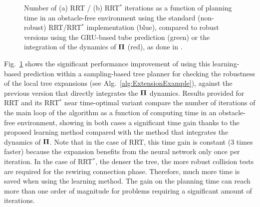 \begin{figure} [!t]
    \centering
    \caption{Number of (a) RRT / (b) RRT$^*$ iterations as a function of planning time in an obstacle-free environment using the standard (non-robust) RRT/RRT$^*$ implementation (blue), compared to robust versions using the GRU-based tube prediction (green) or the integration of the dynamics of $\boldsymbol{\Pi}$ (red), as done in \cite{cSAMP}.}%
    \label{fig: NNTime}%
\end{figure}


Fig.~\ref{fig: NNTime} shows the significant performance improvement of using this learning-based prediction within a sampling-based tree planner for checking the robustness of the local tree expansions (see Alg.~\ref{alg:ExtensionExample}), against the previous version \cite{cSAMP} that directly integrates the $\boldsymbol{\Pi}$ dynamics.  
Results provided for RRT and its RRT$^*$ near time-optimal variant compare the number of iterations of the main loop of the algorithm as a function of computing time in an obstacle-free environment, showing in both cases a significant time gain thanks to the proposed learning method compared with the method that integrates the dynamics of $\boldsymbol{\Pi}$.
Note that in the case of RRT, this time gain is constant ($3$ times faster)  because the expansion benefits from the neural network only once per iteration.
In the case of RRT$^*$, the denser the tree, the more robust collision tests are required for the rewiring connection phase. 
Therefore, much more time is saved when using the learning method. 
The gain on the planning time can reach more than one order of magnitude for problems requiring a significant amount of iterations.


